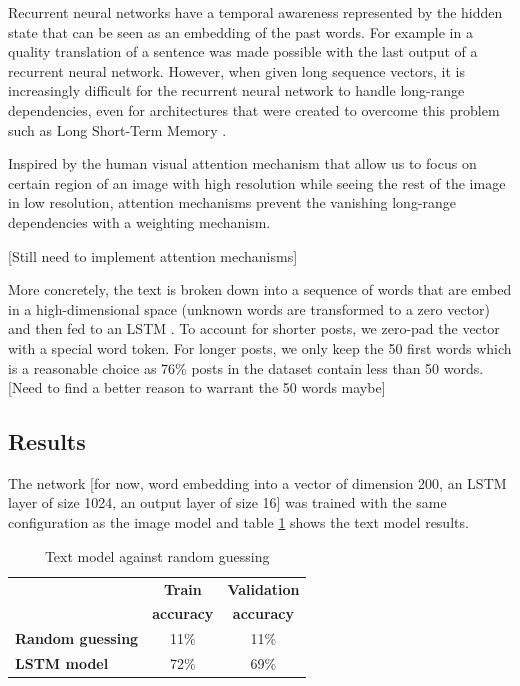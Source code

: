 \documentclass{article} %
\begin{document}
Recurrent neural networks have a temporal awareness represented by the hidden state that can be seen as an embedding of the past words. For example in \citet{Sutskever-14} a quality translation of a sentence was made possible with the last output of a recurrent neural network. However, when given long sequence vectors, it is increasingly difficult for the recurrent neural network to handle long-range dependencies, even for architectures that were created to overcome this problem such as Long Short-Term Memory \citep{Hochreiter-97}.

Inspired by the human visual attention mechanism \citep{Fischer-87} that allow us to focus on certain region of an image with high resolution while seeing the rest of the image in low resolution, attention mechanisms \citep{Bahdanau-15} prevent the vanishing long-range dependencies with a weighting mechanism.

[Still need to implement attention mechanisms]

More concretely, the text is broken down into a sequence of words that are embed in a high-dimensional space (unknown words are transformed to a zero vector) and then fed to an LSTM . To account for shorter posts, we zero-pad the vector with a special word token. For longer posts, we only keep the 50 first words which is a reasonable choice as 76\% posts in the dataset contain less than 50 words. [Need to find a better reason to warrant the 50 words maybe]

\subsection{Results}
The network [for now, word embedding into a vector of dimension 200, an LSTM layer of size 1024, an output layer of size 16] was trained with the same configuration as the image model and table \ref{text-results} shows the text model results.

\begin{table}[H]
\caption{Text model against random guessing}
\begin{center}
    \begin{tabular}{l | c | c}
    & \textbf{Train} & \textbf{Validation} \\
    & \textbf{accuracy} & \textbf{accuracy} \\ \hline
    \textbf{Random guessing} & 11\% & 11\% \\ \hline
    \textbf{LSTM model}  & 72\% & 69\% \\
    \end{tabular}
\end{center}
\label{text-results}
\end{table}
\end{document}
